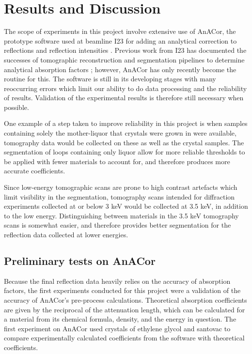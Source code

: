 \section{Results and Discussion}

The scope of experiments in this project involve extensive use of AnACor, the prototype software used at beamline I23 for adding an analytical correction to reflections and reflection intensities \cite{Lu}. Previous work from I23 has documented the successes of tomographic reconstruction and segmentation pipelines to determine analytical absorption factors \cite{Kazantsev2021}; however, AnACor has only recently become the routine for this. The software is still in its developing stages with many reoccurring errors which limit our ability to do data processing and the reliability of results. Validation of the experimental results is therefore still necessary when possible.

One example of a step taken to improve reliability in this project is when samples containing solely the mother-liquor that crystals were grown in were available, tomography data would be collected on these as well as the crystal samples. The segmentation of loops containing only liquor allow for more reliable thresholds to be applied with fewer materials to account for, and therefore produces more accurate coefficients.

Since low-energy tomographic scans are prone to high contrast artefacts which limit visibility in the segmentation, tomography scans intended for diffraction experiments collected at or below 3 \unit{keV} would be collected at 3.5 \unit{keV}, in addition to the low energy. Distinguishing between materials in the 3.5 \unit{keV} tomography scans is somewhat easier, and therefore provides better segmentation for the reflection data collected at lower energies.


\subsection{Preliminary tests on AnACor}

Because the final reflection data heavily relies on the accuracy of absorption factors, the first experiments conducted for this project were a validation of the accuracy of AnACor's pre-process calculations. Theoretical absorption coefficients are given by the reciprocal of the attenuation length, which can be calculated for a material from its chemical formula, density, and the energy in question. The first experiment on AnACor used crystals of ethylene glycol and santovac to compare experimentally calculated coefficients from the software with theoretical coefficients.


